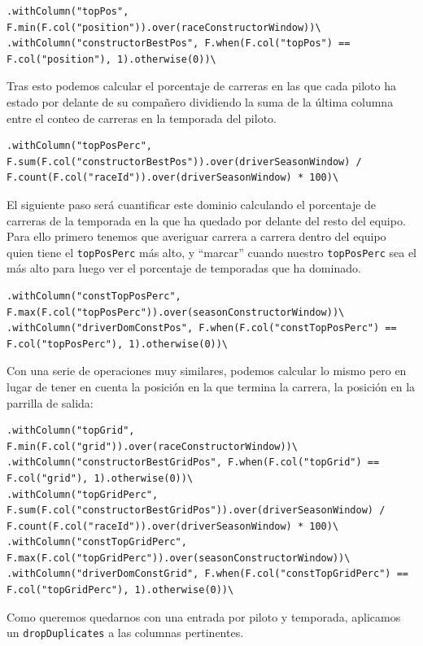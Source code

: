\documentclass[12pt,twoside,titlepage]{report}
\newcommand{\quotes}[1]{``#1''}
\begin{document}
\begin{lstlisting}
.withColumn("topPos", F.min(F.col("position")).over(raceConstructorWindow))\
.withColumn("constructorBestPos", F.when(F.col("topPos") == F.col("position"), 1).otherwise(0))\
\end{lstlisting}

Tras esto podemos calcular el porcentaje de carreras en las que cada piloto ha estado por delante de su compañero dividiendo la suma de la última columna entre el conteo de carreras en la temporada del piloto.

\begin{lstlisting}
.withColumn("topPosPerc", F.sum(F.col("constructorBestPos")).over(driverSeasonWindow) / 
F.count(F.col("raceId")).over(driverSeasonWindow) * 100)\
\end{lstlisting}

El siguiente paso será cuantificar este dominio calculando el porcentaje de carreras de la temporada en la que ha quedado por delante del resto del equipo. Para ello primero tenemos que averiguar carrera a carrera dentro del equipo quien tiene el \texttt{topPosPerc} más alto, y \quotes{marcar} cuando nuestro \texttt{topPosPerc} sea el más alto para luego ver el porcentaje de temporadas que ha dominado.

\begin{lstlisting}
.withColumn("constTopPosPerc", F.max(F.col("topPosPerc")).over(seasonConstructorWindow))\
.withColumn("driverDomConstPos", F.when(F.col("constTopPosPerc") == F.col("topPosPerc"), 1).otherwise(0))\
\end{lstlisting}

Con una serie de operaciones muy similares, podemos calcular lo mismo pero en lugar de tener en cuenta la posición en la que termina la carrera, la posición en la parrilla de salida:

\begin{lstlisting}
.withColumn("topGrid", F.min(F.col("grid")).over(raceConstructorWindow))\
.withColumn("constructorBestGridPos", F.when(F.col("topGrid") == F.col("grid"), 1).otherwise(0))\
.withColumn("topGridPerc", F.sum(F.col("constructorBestGridPos")).over(driverSeasonWindow) / 
F.count(F.col("raceId")).over(driverSeasonWindow) * 100)\
.withColumn("constTopGridPerc", F.max(F.col("topGridPerc")).over(seasonConstructorWindow))\
.withColumn("driverDomConstGrid", F.when(F.col("constTopGridPerc") == F.col("topGridPerc"), 1).otherwise(0))\
\end{lstlisting}

Como queremos quedarnos con una entrada por piloto y temporada, aplicamos un \texttt{dropDuplicates} a las columnas pertinentes.
\end{document}
